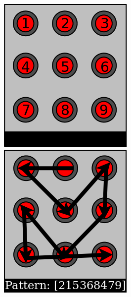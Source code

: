\begin{anexos}
\begin{figure}[H]
	\centering
	\begin{minipage}{0.5\linewidth}  %
		\centering
		\includegraphics[width=0.7\linewidth]{0.png} %
	\end{minipage}%
	\hfill
	\begin{minipage}{0.5\linewidth} %
		\centering
		\includegraphics[width=0.7\linewidth]{1.png} %
	\end{minipage}
	\label{android-pattern}
\end{figure}



\end{anexos}
